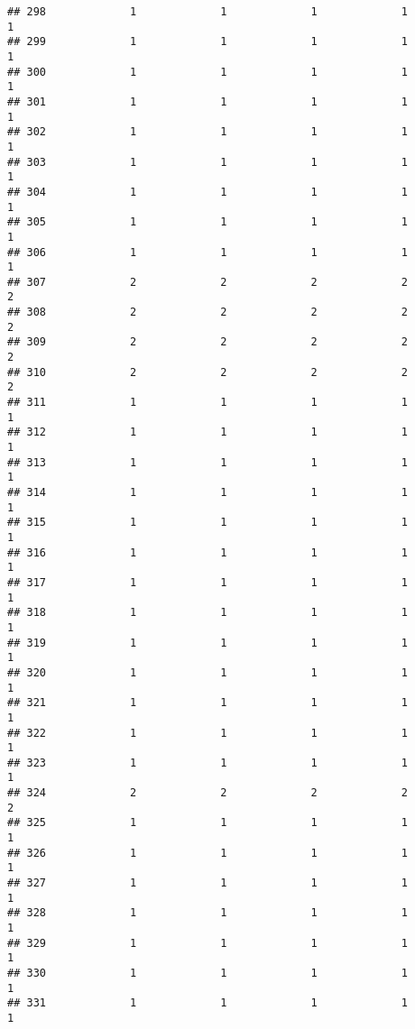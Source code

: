 \documentclass[
]{article}
\begin{document}
\begin{verbatim}
## 298             1             1             1             1             1
## 299             1             1             1             1             1
## 300             1             1             1             1             1
## 301             1             1             1             1             1
## 302             1             1             1             1             1
## 303             1             1             1             1             1
## 304             1             1             1             1             1
## 305             1             1             1             1             1
## 306             1             1             1             1             1
## 307             2             2             2             2             2
## 308             2             2             2             2             2
## 309             2             2             2             2             2
## 310             2             2             2             2             2
## 311             1             1             1             1             1
## 312             1             1             1             1             1
## 313             1             1             1             1             1
## 314             1             1             1             1             1
## 315             1             1             1             1             1
## 316             1             1             1             1             1
## 317             1             1             1             1             1
## 318             1             1             1             1             1
## 319             1             1             1             1             1
## 320             1             1             1             1             1
## 321             1             1             1             1             1
## 322             1             1             1             1             1
## 323             1             1             1             1             1
## 324             2             2             2             2             2
## 325             1             1             1             1             1
## 326             1             1             1             1             1
## 327             1             1             1             1             1
## 328             1             1             1             1             1
## 329             1             1             1             1             1
## 330             1             1             1             1             1
## 331             1             1             1             1             1

\end{verbatim}
\end{document}
